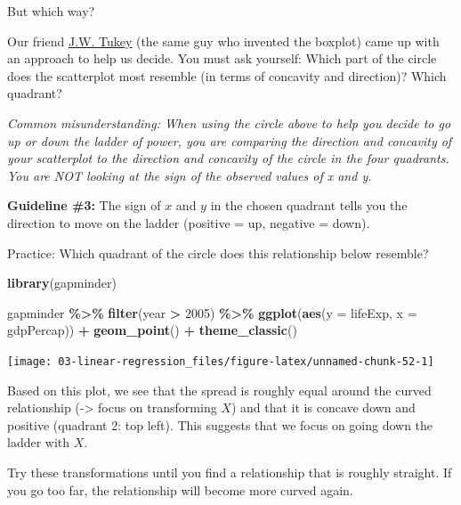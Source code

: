 \documentclass[
]{book}
\newenvironment{Shaded}{\begin{snugshade}}{\end{snugshade}}
\newcommand{\AttributeTok}[1]{\textcolor[rgb]{0.13,0.29,0.53}{#1}}
\newcommand{\DecValTok}[1]{\textcolor[rgb]{0.00,0.00,0.81}{#1}}
\newcommand{\FunctionTok}[1]{\textcolor[rgb]{0.13,0.29,0.53}{\textbf{#1}}}
\newcommand{\NormalTok}[1]{#1}
\newcommand{\SpecialCharTok}[1]{\textcolor[rgb]{0.81,0.36,0.00}{\textbf{#1}}}
\begin{document}
But which way?

Our friend \href{https://en.wikipedia.org/wiki/John_Tukey}{J.W. Tukey} (the same guy who invented the boxplot) came up with an approach to help us decide. You must ask yourself: Which part of the circle does the scatterplot most resemble (in terms of concavity and direction)? Which quadrant?

\emph{Common misunderstanding: When using the circle above to help you decide to go up or down the ladder of power, you are comparing the direction and concavity of your scatterplot to the direction and concavity of the circle in the four quadrants. You are NOT looking at the sign of the observed values of x and y.}

\textbf{Guideline \#3:} The sign of \(x\) and \(y\) in the chosen quadrant tells you the direction to move on the ladder (positive = up, negative = down).

Practice: Which quadrant of the circle does this relationship below resemble?

\begin{Shaded}
\begin{Highlighting}[]
\FunctionTok{library}\NormalTok{(gapminder)}

\NormalTok{gapminder }\SpecialCharTok{\%\textgreater{}\%} 
  \FunctionTok{filter}\NormalTok{(year }\SpecialCharTok{\textgreater{}} \DecValTok{2005}\NormalTok{) }\SpecialCharTok{\%\textgreater{}\%}
  \FunctionTok{ggplot}\NormalTok{(}\FunctionTok{aes}\NormalTok{(}\AttributeTok{y =}\NormalTok{ lifeExp, }\AttributeTok{x =}\NormalTok{  gdpPercap)) }\SpecialCharTok{+} 
  \FunctionTok{geom\_point}\NormalTok{() }\SpecialCharTok{+} 
  \FunctionTok{theme\_classic}\NormalTok{()}
\end{Highlighting}
\end{Shaded}

\begin{center}\texttt{[image: 03-linear-regression\_files/figure-latex/unnamed-chunk-52-1]} \end{center}

Based on this plot, we see that the spread is roughly equal around the curved relationship (-\textgreater{} focus on transforming \(X\)) and that it is concave down and positive (quadrant 2: top left). This suggests that we focus on going down the ladder with \(X\).

Try these transformations until you find a relationship that is roughly straight. If you go too far, the relationship will become more curved again.
\end{document}
